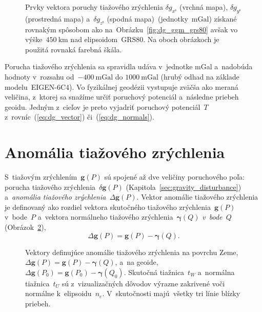 \documentclass[a4paper,12pt]{book}
\let\vec\mathbf
\begin{document}
\begin{figure}
\caption{Prvky vektora poruchy tiažového zrýchlenia $\delta g_{x^\mathrm{s}}$ 
(vrchná mapa), $\delta g_{y^\mathrm{s}}$ (prostredná mapa) a~$\delta 
g_{z^\mathrm{s}}$ (spodná mapa)~(jednotky~$\mathrm{mGal}$) získané rovnakým 
spôsobom ako na~Obrázku~\ref{fig:dg_ggm_grs80} avšak vo výške~$450\ 
\mathrm{km}$ nad elipsoidom~GRS80.  Na oboch obrázkoch je použitá rovnaká 
farebná škála.}
\label{fig:dg_ggm_450km}
\end{figure}

Porucha tiažového zrýchlenia sa spravidla udáva v~jednotke mGal a~nadobúda 
hodnoty v~rozsahu od~$-400\ \mathrm{mGal}$ do $1000\ \mathrm{mGal}$ (hrubý 
odhad na základe modelu~EIGEN-6C4).  Vo fyzikálnej geodézii vystupuje zväčša 
ako meraná veličina, z~ktorej sa snažíme určiť poruchový potenciál a~následne 
priebeh geoidu.  Jedným z~cieľov je preto vyjadriť poruchový potenciál~$T$ 
z~rovníc~(\ref{eq:dg_vector}) či~(\ref{eq:dg_normals}).





\section{Anomália tiažového zrýchlenia}
\label{sec:gravity_anomaly}

S~tiažovým zrýchlením~$\vec g(P)$ sú spojené až dve veličiny poruchového poľa: 
porucha tiažového zrýchlenia~$\delta \vec g(P)$ 
(Kapitola~\ref{sec:gravity_disturbance}) a~\emph{anomália tiažového 
zrýchlenia}~$\Delta \vec g(P)$.  Vektor anomálie tiažového zrýchlenia je 
definovaný ako rozdiel vektora skutočného tiažového zrýchlenia~$\vec g(P)$ 
v~bode~$P$ a~vektora normálneho tiažového zrýchlenia~$\boldsymbol\gamma(Q)$ 
\emph{v~bode~$Q$} (Obrázok~\ref{fig:gravity_anomaly}),
%
\begin{equation}
\label{eq:Dg_vector_earth}
\Delta \vec g(P) = \vec g(P) - \boldsymbol\gamma (Q).
\end{equation}

\begin{figure}[bt]
\centering

\caption{Vektory definujúce anomálie tiažového zrýchlenia na povrchu 
Zeme,~$\Delta \vec g(P) = \vec g(P) - \boldsymbol \gamma(Q)$, a~na geoide, 
$\Delta \vec g(P_0) = \vec g(P_0) - \boldsymbol\gamma(Q_0)$.  Skutočná 
tiažnica~$t_W$ a~normálna tiažnica~$t_U$ sú z~vizualizačných dôvodov výrazne 
zakrivené voči normálne k~elipsoidu~$n_e$.  V~skutočnosti majú~všetky tri línie 
blízky priebeh.}
\label{fig:gravity_anomaly}
\end{figure}
\end{document}

